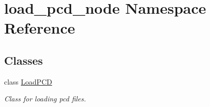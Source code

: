 \hypertarget{namespaceload__pcd__node}{}\section{load\+\_\+pcd\+\_\+node Namespace Reference}
\label{namespaceload__pcd__node}
\subsection*{Classes}
\begin{DoxyCompactItemize}
\item 
class \hyperlink{classload__pcd__node_1_1_load_p_c_d}{Load\+P\+CD}
\begin{DoxyCompactList}\small\item\em Class for loading pcd files. \end{DoxyCompactList}\end{DoxyCompactItemize}
